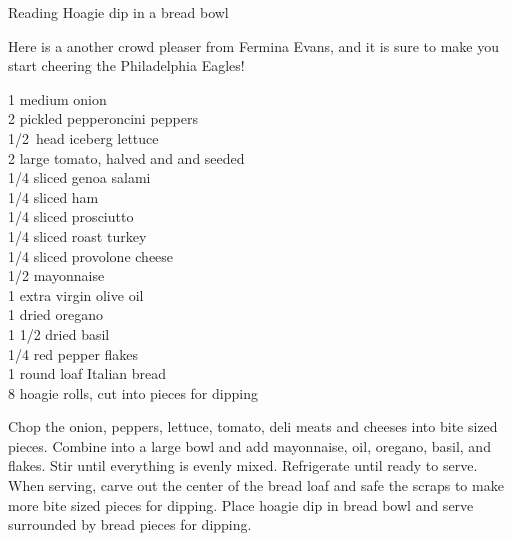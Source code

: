 \begin{entry}{Reading Hoagie dip in a bread bowl}

\begin{open}
  Here is a another crowd pleaser from Fermina Evans, and it is sure to make
  you start cheering the Philadelphia Eagles!
\end{open}

\begin{ingredients}
    1 medium onion\\
    2 pickled pepperoncini peppers\\
    \SI{1/2}{head} iceberg lettuce\\
    2 large tomato, halved and and seeded\\
    \SI{1/4}{\pound} sliced genoa salami\\
    \SI{1/4}{\pound} sliced ham\\
    \SI{1/4}{\pound} sliced prosciutto\\
    \SI{1/4}{\pound} sliced roast turkey\\
    \SI{1/4}{\pound} sliced provolone cheese\\
    \SI{1/2}{\cup} mayonnaise\\
    \SI{1}{\tblspoon} extra virgin olive oil\\
    \SI{1}{\teaspoon} dried oregano\\
    1 \SI{1/2}{\teaspoon} dried basil\\
    \SI{1/4}{\teaspoon} red pepper flakes\\
    1 round loaf Italian bread\\
    8 hoagie rolls, cut into pieces for dipping
\end{ingredients}


Chop the onion, peppers, lettuce, tomato, deli meats and cheeses into bite
sized pieces. Combine into a large bowl and add mayonnaise, oil, oregano,
basil, and flakes. Stir until everything is evenly mixed. Refrigerate until
ready to serve. When serving, carve out the center of the bread loaf and safe
the scraps to make more bite sized pieces for dipping. Place hoagie dip in
bread bowl and serve surrounded by bread pieces for dipping.
\end{entry}
